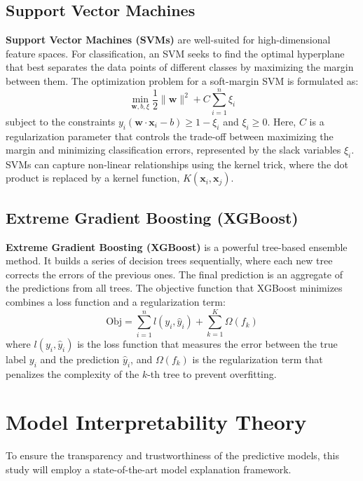 \subsection{Support Vector Machines}
\textbf{Support Vector Machines (SVMs)} are well-suited for high-dimensional feature spaces. For classification, an SVM seeks to find the optimal hyperplane that best separates the data points of different classes by maximizing the margin between them. The optimization problem for a soft-margin SVM is formulated as:
$$\min_{\mathbf{w}, b, \xi} \frac{1}{2} \|\mathbf{w}\|^2 + C \sum_{i=1}^{n} \xi_i$$
subject to the constraints $y_i(\mathbf{w} \cdot \mathbf{x}_i - b) \geq 1 - \xi_i$ and $\xi_i \geq 0$. Here, $C$ is a regularization parameter that controls the trade-off between maximizing the margin and minimizing classification errors, represented by the slack variables $\xi_i$. SVMs can capture non-linear relationships using the kernel trick, where the dot product is replaced by a kernel function, $K(\mathbf{x}_i, \mathbf{x}_j)$.

\subsection{Extreme Gradient Boosting (XGBoost)}
\textbf{Extreme Gradient Boosting (XGBoost)} is a powerful tree-based ensemble method. It builds a series of decision trees sequentially, where each new tree corrects the errors of the previous ones. The final prediction is an aggregate of the predictions from all trees. The objective function that XGBoost minimizes combines a loss function and a regularization term:
$$\text{Obj} = \sum_{i=1}^{n} l(y_i, \hat{y}_i) + \sum_{k=1}^{K} \Omega(f_k)$$
where $l(y_i, \hat{y}_i)$ is the loss function that measures the error between the true label $y_i$ and the prediction $\hat{y}_i$, and $\Omega(f_k)$ is the regularization term that penalizes the complexity of the $k$-th tree to prevent overfitting.

\section{Model Interpretability Theory}
\label{sec:interpretability_theory}
To ensure the transparency and trustworthiness of the predictive models, this study will employ a state-of-the-art model explanation framework.

